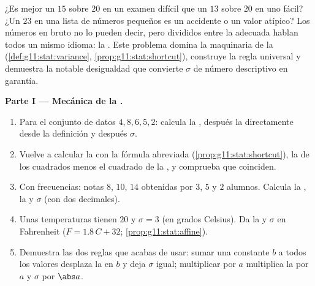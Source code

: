 \begin{problem}
\label{pb:g11:stat:1}
¿Es mejor un $15$ sobre $20$ en un examen difícil que un $13$ sobre $20$
en uno fácil? ¿Un $23$ en una lista de números pequeños es un accidente o
un valor atípico? Los números en bruto no lo pueden decir, pero divididos
entre la  adecuada hablan todos un mismo idioma: la
\emph{}. Este problema domina la maquinaria de la 
(\cref{def:g11:stat:variance}, \cref{prop:g11:stat:shortcut}), construye
la regla universal y demuestra la notable desigualdad que convierte
$\sigma$ de número descriptivo en garantía.

\medskip
\noindent\textbf{Parte I --- Mecánica de la .}
\begin{enumerate}
  \item Para el conjunto de datos $4, 8, 6, 5, 2$: calcula la ,
        después la  directamente desde la definición y después
        $\sigma$.
  \item Vuelve a calcular la  con la fórmula abreviada
        (\cref{prop:g11:stat:shortcut}), la  de los cuadrados menos
        el cuadrado de la , y comprueba que coinciden.
  \item Con frecuencias: notas $8$, $10$, $14$ obtenidas por $3$, $5$ y
        $2$ alumnos. Calcula la , la  y $\sigma$ (con dos
        decimales).
  \item Unas temperaturas tienen  $20$ y $\sigma = 3$ (en grados
        Celsius). Da la  y $\sigma$ en Fahrenheit
        ($F = 1.8\,C + 32$; \cref{prop:g11:stat:affine}).
  \item Demuestra las dos reglas que acabas de usar: sumar una constante
        $b$ a todos los valores desplaza la  en $b$ y deja $\sigma$
        igual; multiplicar por $a$ multiplica la  por $a$ y $\sigma$
        por $\abs a$.
\end{enumerate}


\end{problem}
